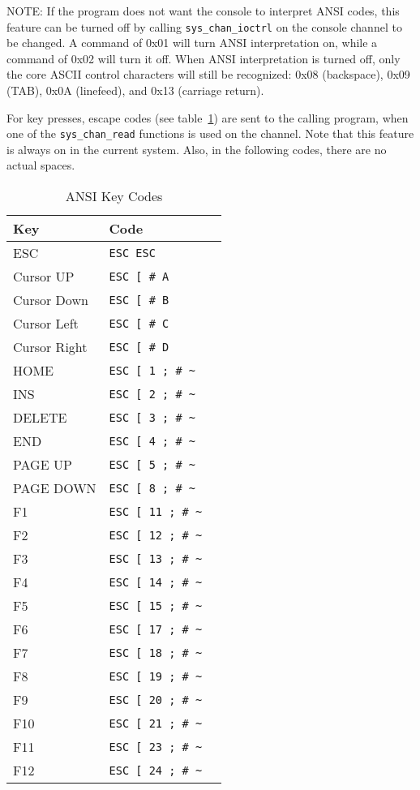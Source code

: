 NOTE: If the program does not want the console to interpret ANSI codes, this feature can be turned off by calling \verb+sys_chan_ioctrl+ on the console channel to be changed. A command of 0x01 will turn ANSI interpretation on, while a command of 0x02 will turn it off. When ANSI interpretation is turned off, only the core ASCII control characters will still be recognized: 0x08 (backspace), 0x09 (TAB), 0x0A (linefeed), and 0x13 (carriage return).

For key presses, escape codes (see table~\ref{tbl:ansi_key_codes}) are sent to the calling program,
when one of the \verb+sys_chan_read+ functions is used on the channel.
Note that this feature is always on in the current system. Also, in the following codes, there are no actual spaces.

\begin{table}
	\begin{center}
		\begin{tabular}{|l|l|l|} \hline
		Key & Code \\ \hline\hline
		ESC & \verb+ESC ESC+ \\ \hline
		Cursor UP & \verb+ESC [ # A+ \\ \hline
		Cursor Down & \verb+ESC [ # B+ \\ \hline
		Cursor Left & \verb+ESC [ # C+ \\ \hline
		Cursor Right & \verb+ESC [ # D+ \\ \hline
		HOME & \verb+ESC [ 1 ; # ~+ \\ \hline
		INS & \verb+ESC [ 2 ; # ~+ \\ \hline
		DELETE & \verb+ESC [ 3 ; # ~+ \\ \hline
		END & \verb+ESC [ 4 ; # ~+ \\ \hline
		PAGE UP & \verb+ESC [ 5 ; # ~+ \\ \hline
		PAGE DOWN & \verb+ESC [ 8 ; # ~+ \\ \hline
		F1 & \verb+ESC [ 11 ; # ~+ \\ \hline
		F2 & \verb+ESC [ 12 ; # ~+ \\ \hline
		F3 & \verb+ESC [ 13 ; # ~+ \\ \hline
		F4 & \verb+ESC [ 14 ; # ~+ \\ \hline
		F5 & \verb+ESC [ 15 ; # ~+ \\ \hline
		F6 & \verb+ESC [ 17 ; # ~+ \\ \hline
		F7 & \verb+ESC [ 18 ; # ~+ \\ \hline
		F8 & \verb+ESC [ 19 ; # ~+ \\ \hline
		F9 & \verb+ESC [ 20 ; # ~+ \\ \hline
		F10 & \verb+ESC [ 21 ; # ~+ \\ \hline
		F11 & \verb+ESC [ 23 ; # ~+ \\ \hline
		F12 & \verb+ESC [ 24 ; # ~+ \\ \hline
		\end{tabular}
	\end{center}
    \caption{ANSI Key Codes}
    \label{tbl:ansi_key_codes}
\end{table}

